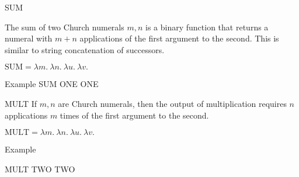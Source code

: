 \documentclass{beamer}
\begin{document}
\begin{frame}{SUM}

  The sum of two Church numerals $m,n$ is a binary function that returns a numeral with $m+n$ applications of the first argument to the second. This is similar to string concatenation of successors.
  
  \vspace{0.3cm}
  
  $\text{SUM} = \lambda m. \ \lambda n. \ \lambda u. \ \lambda v. \ $
  
  \vspace{5cm}

\end{frame}

\begin{frame}{Example}
  SUM ONE ONE
  
  \vspace{7cm} 
\end{frame}

\begin{frame}{MULT}
  If $m,n$ are Church numerals, then the output of multiplication requires $n$ applications $m$ times of the first argument to the second. 
  
  \vspace{0.3cm}
  
  $\text{MULT} = \lambda m. \ \lambda n. \ \lambda u. \ \lambda v. \ $
  
  \vspace{6cm}      
\end{frame}

\begin{frame}{Example}

  MULT TWO TWO
  
  \vspace{7cm}   
  
\end{frame}
\end{document}
